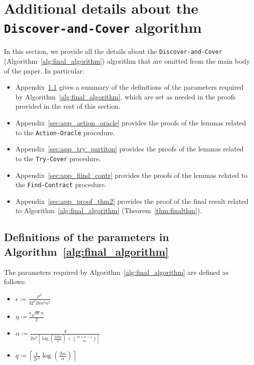 \section{Additional details about the \texttt{Discover-and-Cover} algorithm}\label{sec:app_algo}


In this section, we provide all the details about the \texttt{Discover-and-Cover} (Algorithm~\ref{alg:final_algorithm}) algorithm that are omitted from the main body of the paper.
%
In particular:
\begin{itemize}
	\item Appendix~\ref{sec:app_params} gives a summary of the definitions of the parameters required by Algorithm~\ref{alg:final_algorithm}, which are set as needed in the proofs provided in the rest of this section.
	\item Appendix~\ref{sec:app_action_oracle} provides the proofs of the lemmas related to the \texttt{Action-Oracle} procedure.
	\item Appendix~\ref{sec:app_try_partiton} provides the proofs of the lemmas related to the \texttt{Try-Cover} procedure.
	\item Appendix~\ref{sec:app_fiind_contr} provides the proofs of the lemmas related to the \texttt{Find-Contract} procedure.
	\item Appendix~\ref{sec:app_proof_thm2} provides the proof of the final result related to Algorithm~\ref{alg:final_algorithm} (Theorem~\ref{thm:finalthm}).
\end{itemize}

\allowdisplaybreaks

\subsection{Definitions of the parameters in Algorithm~\ref{alg:final_algorithm}}\label{sec:app_params}

The parameters required by Algorithm~\ref{alg:final_algorithm} are defined as follows:
\begin{itemize}
	\item $\displaystyle \epsilon  \coloneqq \frac{\rho^2}{32^2 B m^2 n^2}  $
	\item $\displaystyle \eta \coloneqq \frac{\epsilon \sqrt{m} n }{2}$
	\item $\displaystyle \alpha \coloneqq \frac{\delta}{2 n^3 \left[ \log \left(\frac{2Bm}{\eta}\right) + \binom{ m + n +1}{m}  \right]}$
	\item $\displaystyle q \coloneqq \left\lceil \frac{1}{2 \epsilon^2} \log \left(\frac{2 m}{\alpha}\right) \right\rceil$
\end{itemize}

